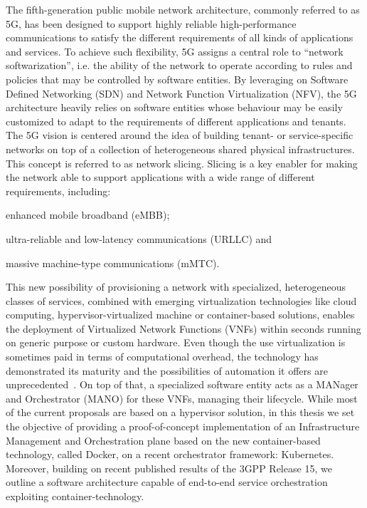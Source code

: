 The fifth-generation public mobile network architecture, commonly referred to as
5G, has been designed to support highly reliable high-performance communications
to satisfy the different requirements of all kinds of applications and services.
To achieve such flexibility, 5G assigns a central role to “network
softwarization”, i.e. the ability of the network to operate according to rules
and policies that may be controlled by software entities. By leveraging on
Software Defined Networking (SDN) and Network Function Virtualization (NFV), the
5G architecture heavily relies on software entities whose behaviour may be
easily customized to adapt to the requirements of different applications and
tenants. The 5G vision is centered around the idea of building tenant- or
service-specific networks on top of a collection of heterogeneous shared
physical infrastructures. This concept is referred to as network slicing.
Slicing is a key enabler for making the network able to support applications
with a wide range of different requirements, including:
\begin{enumerate*}[label=(\roman*)]
\item enhanced mobile broadband (eMBB);
\item ultra-reliable and low-latency communications (URLLC) and
\item massive machine-type communications (mMTC).
\end{enumerate*}

This new possibility of provisioning a network with specialized, heterogeneous
classes of services, combined with emerging virtualization technologies like
cloud computing, hypervisor-virtualized machine or container-based solutions,
enables the deployment of Virtualized Network Functions (VNFs) within seconds
running on generic purpose or custom hardware. Even though the use
virtualization is sometimes paid in terms of computational overhead, the
technology has demonstrated its maturity and the possibilities of automation it
offers are unprecedented~\cite{nguyen2017sdn}. On top of that, a specialized
software entity acts as a MANager and Orchestrator (MANO) for these VNFs,
managing their lifecycle. While most of the current proposals are based on a
hypervisor solution, in this thesis we set the objective of providing a
proof-of-concept implementation of an Infrastructure Management and
Orchestration plane based on the new container-based technology, called Docker,
on a recent orchestrator framework: Kubernetes. Moreover, building on recent
published results of the 3GPP Release 15, we outline a software architecture
capable of end-to-end service orchestration exploiting container-technology.
 
